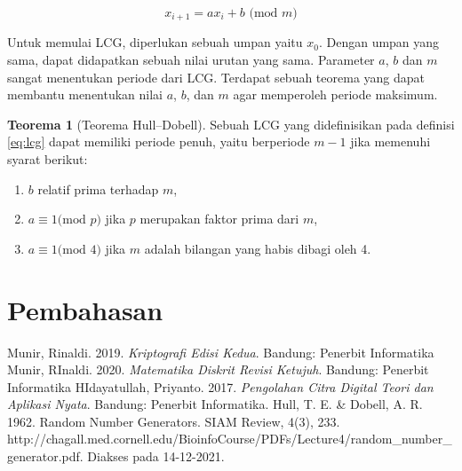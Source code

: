\documentclass[10pt,conference]{IEEEtran}
\theoremstyle{definition}
\newtheorem{theorem}{Teorema}[section]
\begin{document}
\begin{equation} \label{eq:lcg}
    x_{i+1} = ax_{i}+b \text{ (mod }m\text{)}
\end{equation}

Untuk memulai LCG, diperlukan sebuah umpan yaitu $x_0$. Dengan umpan yang sama, dapat didapatkan sebuah nilai urutan yang sama. 
Parameter $a$, $b$ dan $m$ sangat menentukan periode dari LCG. Terdapat sebuah teorema
yang dapat membantu menentukan nilai $a$, $b$, dan $m$ agar memperoleh periode maksimum. \cite{a1}

\begin{theorem}[Teorema Hull–Dobell]
    Sebuah LCG yang didefinisikan pada definisi \ref{eq:lcg} dapat memiliki periode penuh, yaitu berperiode $m-1$ jika memenuhi syarat berikut:
    \begin{enumerate}
        \item $b$ relatif prima terhadap $m$,
        \item $a \equiv 1 \text{(mod }p\text{)}$ jika $p$ merupakan faktor prima dari $m$,
        \item $a \equiv 1 \text{(mod }4\text{)}$ jika $m$ adalah bilangan yang habis dibagi oleh 4.
    \end{enumerate}
\end{theorem}

\section{Pembahasan}

\begin{thebibliography}{00}
 Munir, Rinaldi. 2019. \emph{Kriptografi Edisi Kedua}. Bandung: Penerbit Informatika 
 Munir, RInaldi. 2020. \emph{Matematika Diskrit Revisi Ketujuh}. Bandung: Penerbit Informatika
 HIdayatullah, Priyanto. 2017. \emph{Pengolahan Citra Digital Teori dan Aplikasi Nyata}. Bandung: Penerbit Informatika.
 Hull, T. E. \& Dobell, A. R. 1962. Random Number Generators. SIAM Review, 4(3), 233. http://chagall.med.cornell.edu/BioinfoCourse/PDFs/Lecture4/random\_number\_generator.pdf. Diakses pada 14-12-2021.
\end{thebibliography}
\end{document}
